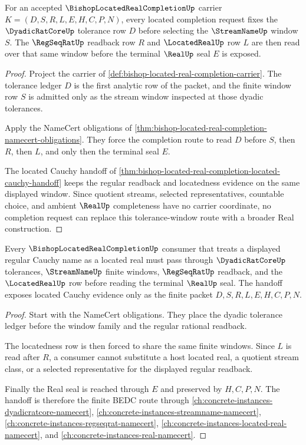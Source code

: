 \begin{theorem}
\label{thm:bishop-located-real-completion-tolerance-window-exactness}
For an accepted $\BishopLocatedRealCompletionUp$ carrier $K=(D,S,R,L,E,H,C,P,N)$, every located completion request fixes the $\DyadicRatCoreUp$ tolerance row $D$ before selecting the $\StreamNameUp$ window $S$. The $\RegSeqRatUp$ readback row $R$ and $\LocatedRealUp$ row $L$ are then read over that same window before the terminal $\RealUp$ seal $E$ is exposed.
\end{theorem}
\begin{proof}
Project the carrier of \autoref{def:bishop-located-real-completion-carrier}. The tolerance ledger $D$ is the first analytic row of the packet, and the finite window row $S$ is admitted only as the stream window inspected at those dyadic tolerances.

Apply the NameCert obligations of \autoref{thm:bishop-located-real-completion-namecert-obligations}. They force the completion route to read $D$ before $S$, then $R$, then $L$, and only then the terminal seal $E$.

The located Cauchy handoff of \autoref{thm:bishop-located-real-completion-located-cauchy-handoff} keeps the regular readback and locatedness evidence on the same displayed window. Since quotient streams, selected representatives, countable choice, and ambient $\RealUp$ completeness have no carrier coordinate, no completion request can replace this tolerance-window route with a broader Real construction.
\end{proof}

\begin{theorem}
\label{thm:bishop-located-real-completion-located-cauchy-handoff}
Every $\BishopLocatedRealCompletionUp$ consumer that treats a displayed regular Cauchy name as a located real must pass through $\DyadicRatCoreUp$ tolerances, $\StreamNameUp$ finite windows, $\RegSeqRatUp$ readback, and the $\LocatedRealUp$ row before reading the terminal $\RealUp$ seal. The handoff exposes located Cauchy evidence only as the finite packet $D,S,R,L,E,H,C,P,N$.
\end{theorem}
\begin{proof}
Start with the NameCert obligations. They place the dyadic tolerance ledger before the window family and the regular rational readback.

The locatedness row is then forced to share the same finite windows. Since $L$ is read after $R$, a consumer cannot substitute a host located real, a quotient stream class, or a selected representative for the displayed regular readback.

Finally the Real seal is reached through $E$ and preserved by $H,C,P,N$. The handoff is therefore the finite BEDC route through \autoref{ch:concrete-instances-dyadicratcore-namecert}, \autoref{ch:concrete-instances-streamname-namecert}, \autoref{ch:concrete-instances-regseqrat-namecert}, \autoref{ch:concrete-instances-located-real-namecert}, and \autoref{ch:concrete-instances-real-namecert}.
\end{proof}

